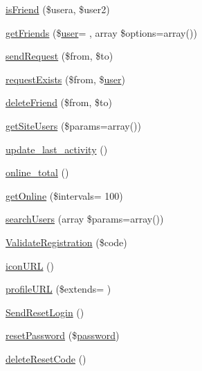\begin{DoxyCompactItemize}
\item 
\hyperlink{class_ossn_user_a669087d8a2169649b7b76e66a2502bb7}{is\+Friend} (\$usera, \$user2)
\item 
\hyperlink{class_ossn_user_ae2ab40e80487abc9b3251fe855790bc1}{get\+Friends} (\$\hyperlink{ossn_8config_8db_8example_8php_a802544b7ba9f79bbf24ef67773d53bed}{user}= \textquotesingle{}\textquotesingle{}, array \$options=array())
\item 
\hyperlink{class_ossn_user_ad7f6e3c42fbe1373f41a78bb5fb92043}{send\+Request} (\$from, \$to)
\item 
\hyperlink{class_ossn_user_a91dd4075374ca0c1e082e3093f19c284}{request\+Exists} (\$from, \$\hyperlink{ossn_8config_8db_8example_8php_a802544b7ba9f79bbf24ef67773d53bed}{user})
\item 
\hyperlink{class_ossn_user_afa8453c434c76c37973a4deeb97d1088}{delete\+Friend} (\$from, \$to)
\item 
\hyperlink{class_ossn_user_a3d7c8bd2f23157fb82938f4483fa96fa}{get\+Site\+Users} (\$params=array())
\item 
\hyperlink{class_ossn_user_a451896c212bc72020029642e8c86e343}{update\+\_\+last\+\_\+activity} ()
\item 
\hyperlink{class_ossn_user_aa4e9e703523721959b8fd21d063d2f6e}{online\+\_\+total} ()
\item 
\hyperlink{class_ossn_user_aaf9e411226ae1c8231ad6fc6811c2e06}{get\+Online} (\$intervals= \textquotesingle{}100\textquotesingle{})
\item 
\hyperlink{class_ossn_user_abcfcb1f1bfba94db29cfeb7767f59ca7}{search\+Users} (array \$params=array())
\item 
\hyperlink{class_ossn_user_a9f15a213cf4ddb9cbc6385e5aefb8b51}{Validate\+Registration} (\$code)
\item 
\hyperlink{class_ossn_user_aeceb5cef62a3133d282fbb6706bcb1fa}{icon\+U\+RL} ()
\item 
\hyperlink{class_ossn_user_a1bdb669c6b82b21188d65d7ac9f42428}{profile\+U\+RL} (\$extends= \textquotesingle{}\textquotesingle{})
\item 
\hyperlink{class_ossn_user_a4ba3f5f1a4abd7cf8abf29f56b09627f}{Send\+Reset\+Login} ()
\item 
\hyperlink{class_ossn_user_a145103c5602feef3a79b2fada0499a99}{reset\+Password} (\$\hyperlink{actions_2account_8php_a3ef39d3ee8b2bcca6a288308549ccb44}{password})
\item 
\hyperlink{class_ossn_user_a6185742d538e536c90d3132fa2c2ccc6}{delete\+Reset\+Code} ()
\item 

\end{DoxyCompactItemize}
